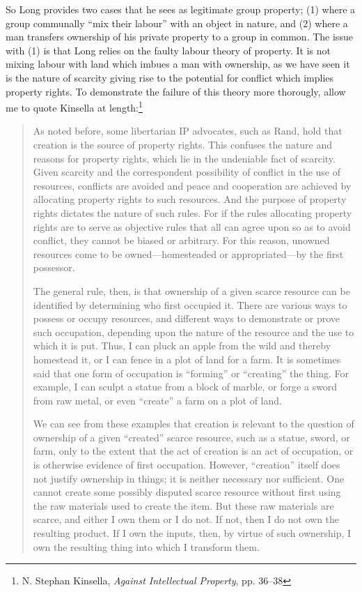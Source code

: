 \documentclass[11pt]{article}
\begin{document}
So Long provides two cases that he sees as legitimate group property; (1) where a group communally “mix their labour” with an object in nature, and (2) where a man transfers ownership of his private property to a group in common. The issue with (1) is that Long relies on the faulty labour theory of property. It is not mixing labour with land which imbues a man with ownership, as we have seen it is the nature of scarcity giving rise to the potential for conflict which implies property rights. To demonstrate the failure of this theory more thorougly, allow me to quote Kinsella at length:\footnote{N. Stephan Kinsella, \emph{Against Intellectual Property}, pp. 36–38}
\begin{quote}
As noted before, some libertarian IP advocates, such as Rand, hold that creation is the source of property rights. This confuses the nature and reasons for property rights, which lie in the undeniable fact of scarcity. Given scarcity and the correspondent possibility of conflict in the use of resources, conflicts are avoided and peace and cooperation are achieved by allocating property rights to such resources. And the purpose of property rights dictates the nature of such rules. For if the rules allocating property rights are to serve as objective rules that all can agree upon so as to avoid conflict, they cannot be biased or arbitrary. For this reason, unowned resources come to be owned—homesteaded or appropriated—by the first possessor.

The general rule, then, is that ownership of a given scarce resource can be identified by determining who first occupied it. There are various ways to possess or occupy resources, and different ways to demonstrate or prove such occupation, depending upon the nature of the resource and the use to which it is put. Thus, I can pluck an apple from the wild and thereby homestead it, or I can fence in a plot of land for a farm. It is sometimes said that one form of occupation is “forming” or “creating” the thing. For example, I can sculpt a statue from a block of marble, or forge a sword from raw metal, or even “create” a farm on a plot of land.

We can see from these examples that creation is relevant to the question of ownership of a given “created” scarce resource, such as a statue, sword, or farm, only to the extent that the act of creation is an act of occupation, or is otherwise evidence of first occupation. However, “creation” itself does not justify ownership in things; it is neither necessary nor sufficient. One cannot create some possibly disputed scarce resource without first using the raw materials used to create the item. But these raw materials are scarce, and either I own them or I do not. If not, then I do not own the resulting product. If I own the inputs, then, by virtue of such ownership, I own the resulting thing into which I transform them.


\end{quote}
\end{document}
